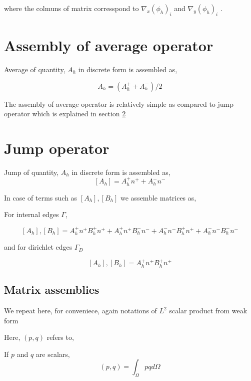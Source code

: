\documentclass[a4paper,12pt]{book}
\begin{document}
where the colmuns of matrix corresspond to $\nabla_x (\phi_h)_{i}$ and $\nabla_y (\phi_h)_{i}$ .

\section{Assembly of average operator}

Average of quantity, $A_h$ in discrete form is assembled as,

\begin{equation}\label{Average operator}
{A_h} = (A_h^+ + A_h^-)/2
\end{equation}

The assembly of average operator is relatively simple as compared to jump operator which is explained in section \ref{Jump operator}

\section{Jump operator} \label{Jump operator}

Jump of quantity, $A_h$ in discrete form is assembled as,
\begin{equation} \label{Jump_operator}
[A_h] = A_h^+ n^+ + A_h^- n^-
\end{equation}

In case of terms such as $[A_h],[B_h]$ we assemble matrices as, 

For internal edges $\Gamma$,

\begin{equation} \label{Jump operator L2}
[A_h],[B_h] = A_h^+ n^+ B_h^+ n^+ + A_h^+ n^+ B_h^- n^- + A_h^- n^- B_h^+ n^+ + A_h^- n^- B_h^- n^-
\end{equation}

and for dirichlet edges $\Gamma_D$

\begin{equation} \label{Jump operator L2 for dirichlet}
[A_h],[B_h] = A_h^+ n^+ B_h^+ n^+ 
\end{equation}


\subsection{Matrix assemblies}

We repeat here, for conveniece, again notations of $L^2$ scalar product from weak form

Here, $(p,q)$ refers to,

If $p$ and $q$ are scalars,
\begin{equation}\label{inner product scalars}
(p,q)=\int_{\Omega} pq d \Omega 
\end{equation}
\end{document}
